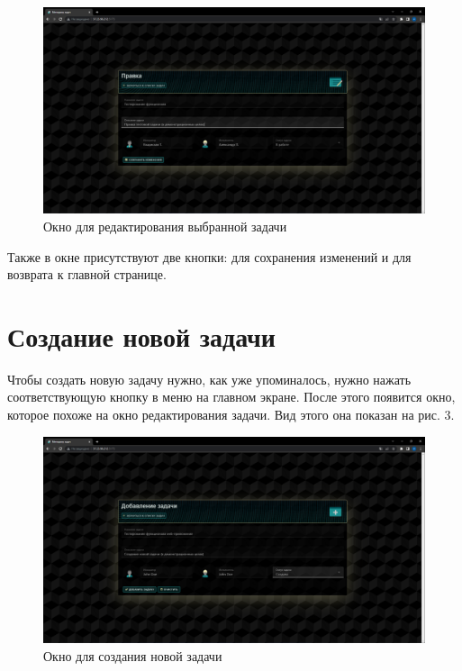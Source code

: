 \documentclass{altsu-report}
\begin{document}
\begin{figure}[H]
    \centering
    \includegraphics[scale=0.3]{edit_task.png}
    \caption{Окно для редактирования выбранной задачи}
    \label{fig:edittask}
\end{figure}

Также в окне присутствуют две кнопки: для сохранения изменений и для возврата к главной странице.

\section*{Создание новой задачи}

Чтобы создать новую задачу нужно, как уже упоминалось, нужно нажать соответствующую кнопку в меню на главном экране. После этого появится окно, которое похоже на окно редактирования задачи. Вид этого она показан на рис. 3.

\begin{figure}[H]
    \centering
    \includegraphics[scale=0.3]{add_task.png}
    \caption{Окно для создания новой задачи}
    \label{fig:addtask}
\end{figure}
\end{document}
